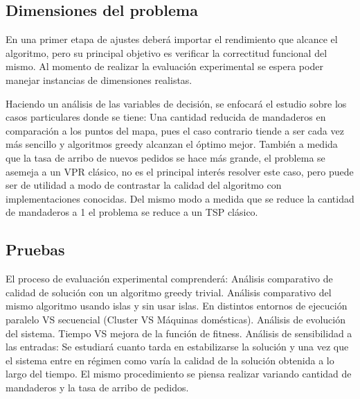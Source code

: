 \documentclass[9pt,conference]{IEEEtran}
\begin{document}
	\subsection{Dimensiones del problema}

			En una primer etapa de ajustes deberá importar el rendimiento que alcance el algoritmo, pero su principal objetivo es verificar la correctitud funcional del mismo.
			Al momento de realizar la evaluación experimental se espera poder manejar instancias de dimensiones realistas.

			Haciendo un análisis de las variables de decisión, se enfocará el estudio sobre los casos particulares donde se tiene:
				Una cantidad reducida de mandaderos en comparación a los puntos del mapa, pues el caso contrario tiende a ser cada vez más sencillo y algoritmos greedy alcanzan el óptimo mejor.
				También a medida que la tasa de arribo de nuevos pedidos se hace más grande, el problema se asemeja a un VPR clásico, no es el principal interés resolver este caso, pero puede ser de utilidad a modo de contrastar la calidad del algoritmo con implementaciones conocidas. Del mismo modo a medida que se reduce la cantidad de mandaderos a 1 el problema se reduce a un TSP clásico.

	\subsection{Pruebas}

		El proceso de evaluación experimental comprenderá:
			Análisis comparativo de calidad de solución con un algoritmo greedy trivial.
			Análisis comparativo del mismo algoritmo usando islas y sin usar islas.
				En distintos entornos de ejecución paralelo VS secuencial (Cluster VS Máquinas domésticas).
			Análisis de evolución del sistema. Tiempo VS mejora de la función de fitness.
			Análisis de sensibilidad a las entradas:
				Se estudiará cuanto tarda en estabilizarse la solución y una vez que el sistema entre en régimen como varía la calidad de la solución obtenida a lo largo del tiempo.
				El mismo procedimiento se piensa realizar variando cantidad de mandaderos y la tasa de arribo de pedidos.




\end{document}
